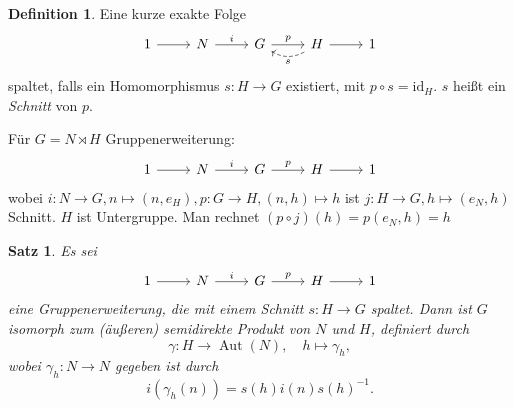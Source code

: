 \documentclass[12pt]{scrartcl} %
\DeclareMathOperator{\Aut}{Aut}
\newtheorem{thm}{Satz}[section]
\theoremstyle{definition}
\newtheorem*{defn}{Definition}
\theoremstyle{remark}
\newcommand{\defi}{\emph}
\begin{document}
\begin{defn}
	Eine kurze exakte Folge
	\[ \begin{tikzcd}
		1 \arrow[r] & N \arrow[r, "i"] & G \arrow[r, "p"] & H \arrow[l, bend left, dashed, "s"] \arrow[r] & 1
	\end{tikzcd} \]
	spaltet, falls ein Homomorphismus $s: H\to G$ existiert, mit $p\circ s = \text{id}_H$.
	$s$ heißt ein \defi{Schnitt} von $p$.
\end{defn}

Für $G=N\rtimes H$ Gruppenerweiterung:
\[ \begin{tikzcd}
		1 \arrow[r] & N \arrow[r,"i"] & G \arrow[r,"p"] & H \arrow[r] & 1
\end{tikzcd} \]
wobei $i: N\to G, n\mapsto (n,e_H), p:G\to H, (n,h)\mapsto h$ ist $j:H\to G, h\mapsto (e_N,h)$ Schnitt. $H$ ist Untergruppe. Man rechnet $(p\circ j)(h)=p(e_N,h)=h$

\begin{thm}
	Es sei
	\[ \begin{tikzcd}
		1 \arrow[r] & N \arrow[r,"i"] & G \arrow[r,"p"] & H \arrow[r] & 1
	\end{tikzcd} \]
	eine Gruppenerweiterung, die mit einem Schnitt $s:H\to G$ spaltet. Dann ist $G$ isomorph zum (äußeren) semidirekte Produkt von $N$ und $H$, definiert durch 
        \[\gamma: H\to \Aut(N), \quad h\mapsto \gamma_h,\]
        wobei $\gamma_h : N \to N$ gegeben ist durch
        \[ i(\gamma_h(n)) = s(h)i(n)s(h)^{-1}.  \]
\end{thm}
\end{document}

